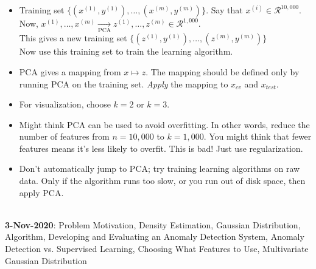 \documentclass[10pt]{article}
\begin{document}
\begin{itemize}
    \item Training set $\{ (x^{(1)},y^{(1)}), \dots, (x^{(m)},y^{(m)}) \}$. Say that $x^{(i)} \in \mathcal{R}^{10,000}$. \\
      Now, $x^{(1)}, \dots, x^{(m)} \xrightarrow[\text{PCA}]{} z^{(1)}, \dots, z^{(m)} \in \mathcal{R}^{1,000}$. \\
      This gives a new training set $\{ (z^{(1)},y^{(1)}), \dots, (z^{(m)},y^{(m)}) \}$\\
      Now use this training set to train the learning algorithm.
    \item PCA gives a mapping from $x \mapsto z$. The mapping should be defined only by running PCA on the training set. \textit{Apply} the mapping to $x_{cv}$ and $x_{test}$.
    \item For visualization, choose $k=2$ or $k=3$.
    \item Might think PCA can be used to avoid overfitting. In other words, reduce the number of features from $n=10,000$ to $k=1,000$. You might think that fewer features means it's less likely to overfit. This is bad! Just use regularization.
    \item Don't automatically jump to PCA; try training learning algorithms on raw data. Only if the algorithm runs too slow, or you run out of disk space, then apply PCA.
\end{itemize}
\hfill \\ {\large \textbf{3-Nov-2020}: Problem Motivation, Density
  Estimation, Gaussian Distribution, Algorithm, Developing and
  Evaluating an Anomaly Detection System, Anomaly Detection
  vs. Supervised Learning, Choosing What Features to Use, Multivariate
  Gaussian Distribution}
\end{document}
